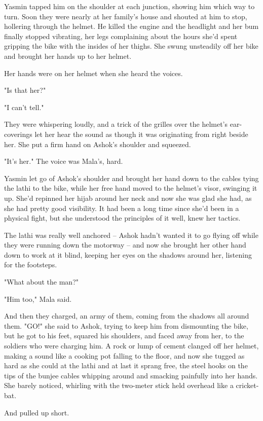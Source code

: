 Yasmin tapped him on the shoulder at each junction, showing him
which way to turn. Soon they were nearly at her family's house and
shouted at him to stop, hollering through the helmet. He killed the
engine and the headlight and her bum finally stopped vibrating, her
legs complaining about the hours she'd spent gripping the bike with
the insides of her thighs. She swung unsteadily off her bike and
brought her hands up to her helmet.

Her hands were on her helmet when she heard the voices.

"Is that her?"

"I can't tell."

They were whispering loudly, and a trick of the grilles over the
helmet's ear-coverings let her hear the sound as though it was
originating from right beside her. She put a firm hand on Ashok's
shoulder and squeezed.

"It's her." The voice was Mala's, hard.

Yasmin let go of Ashok's shoulder and brought her hand down to the
cables tying the lathi to the bike, while her free hand moved to
the helmet's visor, swinging it up. She'd repinned her hijab around
her neck and now she was glad she had, as she had pretty good
visibility. It had been a long time since she'd been in a physical
fight, but she understood the principles of it well, knew her
tactics.

The lathi was really well anchored -- Ashok hadn't wanted it to go
flying off while they were running down the motorway -- and now she
brought her other hand down to work at it blind, keeping her eyes
on the shadows around her, listening for the footsteps.

"What about the man?"

"Him too," Mala said.

And then they charged, an army of them, coming from the shadows all
around them. "GO!" she said to Ashok, trying to keep him from
dismounting the bike, but he got to his feet, squared his
shoulders, and faced away from her, to the soldiers who were
charging him. A rock or lump of cement clanged off her helmet,
making a sound like a cooking pot falling to the floor, and now she
tugged as hard as she could at the lathi and at last it sprang
free, the steel hooks on the tips of the bunjee cables whipping
around and smacking painfully into her hands. She barely noticed,
whirling with the two-meter stick held overhead like a
cricket-bat.

And pulled up short.

